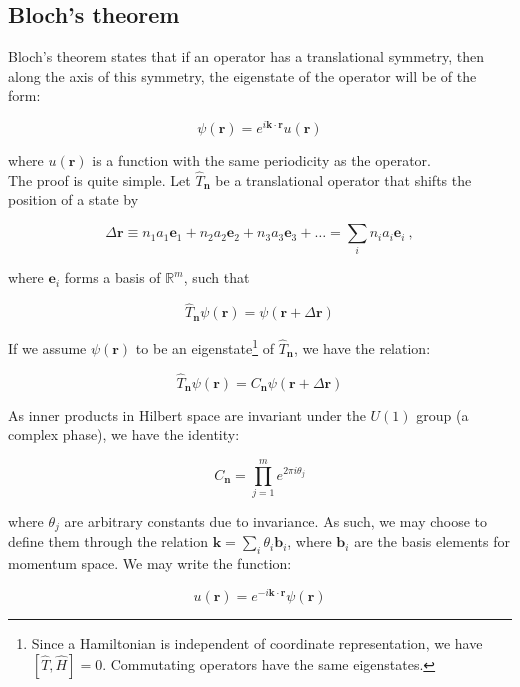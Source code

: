 \documentclass[10pt,twoside]{report}
\begin{document}
	\subsection{Bloch's theorem}
	Bloch's theorem states that if an operator has a translational symmetry, then along the axis of this symmetry, the eigenstate of the operator will be of the form:
	
	\begin{equation}
	\psi(\bm{r}) = e^{i\bm{k}\cdot\bm{r}}u(\bm{r})
	\end{equation}
	
	\noindent where $u(\bm{r})$ is a function with the same periodicity as the operator.\\
	
	The proof is quite simple. Let $\hat{T}_{\bm{n}}$ be a translational operator that shifts the position of a state by
	
	$$
	\Delta \bm{r} \equiv n_1a_1\bm{e}_1 + n_2a_2\bm{e}_2 + n_3a_3\bm{e}_3 + \ldots = \sum_in_ia_i\bm{e}_i\:,
	$$
	
	\noindent where $\bm{e}_i$ forms a basis of $\mathbb{R}^m$, such that
	
	\begin{equation}
	\hat{T}_{\bm{n}}\psi(\bm{r}) = \psi(\bm{r}+\Delta \bm{r})
	\end{equation}
	
	If we assume $\psi(\bm{r})$ to be an eigenstate\footnote{Since a Hamiltonian is independent of coordinate representation, we have $[\hat{T},\hat{H}] = 0$. Commutating operators have the same eigenstates.} of $\hat{T}_{\bm{n}}$, we have the relation:
	
	\begin{equation}
	\hat{T}_{\bm{n}}\psi(\bm{r}) = C_{\bm{n}}\psi(\bm{r}+\Delta\bm{r})
	\end{equation}
	
	As inner products in Hilbert space are invariant under the $U(1)$ group (a complex phase), we have the identity:
	
	\begin{equation}
	C_{\bm{n}} = \prod_{j=1}^me^{2\pi i\theta_j}
	\end{equation}
	
	\noindent where $\theta_j$ are arbitrary constants due to invariance. As such, we may choose to define them through the relation $\bm{k} = \sum_i \theta_i\bm{b}_i$, where $\bm{b}_i$ are the basis elements for momentum space. We may write the function:
	
	\begin{equation}
	u(\bm{r}) = e^{-i\bm{k}\cdot\bm{r}}\psi(\bm{r})
	\end{equation}
	
\end{document}
